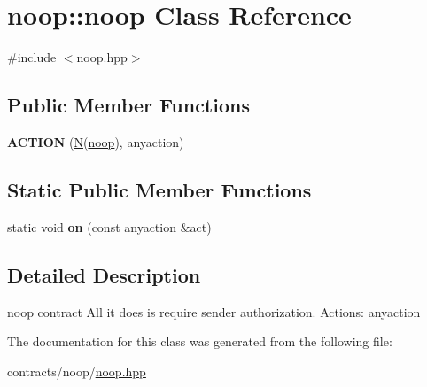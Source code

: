 \hypertarget{classnoop_1_1noop}{}\section{noop\+:\+:noop Class Reference}
\label{classnoop_1_1noop}


{\ttfamily \#include $<$noop.\+hpp$>$}

\subsection*{Public Member Functions}
\begin{DoxyCompactItemize}
\item 
\mbox{\label{classnoop_1_1noop_af21af44b6aa5e01d048afb98345c4c04}} 
{\bfseries A\+C\+T\+I\+ON} (\mbox{\hyperlink{group__types_gaf9c1edb0e0da55ec6ba09f32f6839529}{N}}(\mbox{\hyperlink{classnoop_1_1noop}{noop}}), anyaction)
\end{DoxyCompactItemize}
\subsection*{Static Public Member Functions}
\begin{DoxyCompactItemize}
\item 
\mbox{\label{classnoop_1_1noop_a79becf2c99252ffe3c20893cabad6275}} 
static void {\bfseries on} (const anyaction \&act)
\end{DoxyCompactItemize}


\subsection{Detailed Description}
noop contract All it does is require sender authorization. Actions\+: anyaction 

The documentation for this class was generated from the following file\+:\begin{DoxyCompactItemize}
\item 
contracts/noop/\mbox{\hyperlink{noop_8hpp}{noop.\+hpp}}\end{DoxyCompactItemize}
